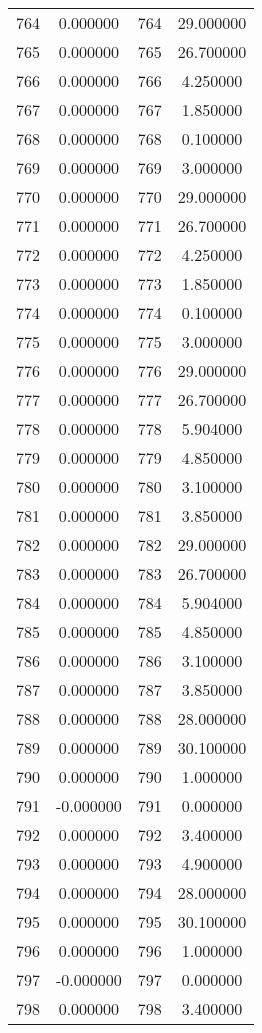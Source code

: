 \documentclass[12pt]{article}
\begin{document}
\begin{longtable}{@{}cccc@{}}
764 & 0.000000 & 764 & 29.000000 \\
765 & 0.000000 & 765 & 26.700000 \\
766 & 0.000000 & 766 & 4.250000 \\
767 & 0.000000 & 767 & 1.850000 \\
768 & 0.000000 & 768 & 0.100000 \\
769 & 0.000000 & 769 & 3.000000 \\
770 & 0.000000 & 770 & 29.000000 \\
771 & 0.000000 & 771 & 26.700000 \\
772 & 0.000000 & 772 & 4.250000 \\
773 & 0.000000 & 773 & 1.850000 \\
774 & 0.000000 & 774 & 0.100000 \\
775 & 0.000000 & 775 & 3.000000 \\
776 & 0.000000 & 776 & 29.000000 \\
777 & 0.000000 & 777 & 26.700000 \\
778 & 0.000000 & 778 & 5.904000 \\
779 & 0.000000 & 779 & 4.850000 \\
780 & 0.000000 & 780 & 3.100000 \\
781 & 0.000000 & 781 & 3.850000 \\
782 & 0.000000 & 782 & 29.000000 \\
783 & 0.000000 & 783 & 26.700000 \\
784 & 0.000000 & 784 & 5.904000 \\
785 & 0.000000 & 785 & 4.850000 \\
786 & 0.000000 & 786 & 3.100000 \\
787 & 0.000000 & 787 & 3.850000 \\
788 & 0.000000 & 788 & 28.000000 \\
789 & 0.000000 & 789 & 30.100000 \\
790 & 0.000000 & 790 & 1.000000 \\
791 & -0.000000 & 791 & 0.000000 \\
792 & 0.000000 & 792 & 3.400000 \\
793 & 0.000000 & 793 & 4.900000 \\
794 & 0.000000 & 794 & 28.000000 \\
795 & 0.000000 & 795 & 30.100000 \\
796 & 0.000000 & 796 & 1.000000 \\
797 & -0.000000 & 797 & 0.000000 \\
798 & 0.000000 & 798 & 3.400000 \\

\end{longtable}
\end{document}
